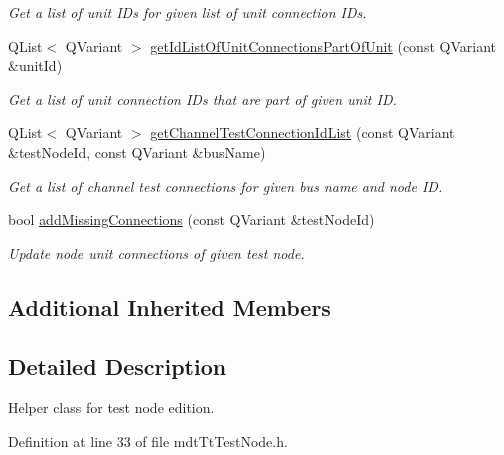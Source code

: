 \begin{DoxyCompactItemize}
\begin{DoxyCompactList}\small\item\em Get a list of unit I\-Ds for given list of unit connection I\-Ds. \end{DoxyCompactList}\item 
Q\-List$<$ Q\-Variant $>$ \hyperlink{classmdt_tt_test_node_aedbfa25bedac04b859b1cb3ef6a16510}{get\-Id\-List\-Of\-Unit\-Connections\-Part\-Of\-Unit} (const Q\-Variant \&unit\-Id)
\begin{DoxyCompactList}\small\item\em Get a list of unit connection I\-Ds that are part of given unit I\-D. \end{DoxyCompactList}\item 
Q\-List$<$ Q\-Variant $>$ \hyperlink{classmdt_tt_test_node_a07b8cd098d61c3f14d3ba226c1d1f1cb}{get\-Channel\-Test\-Connection\-Id\-List} (const Q\-Variant \&test\-Node\-Id, const Q\-Variant \&bus\-Name)
\begin{DoxyCompactList}\small\item\em Get a list of channel test connections for given bus name and node I\-D. \end{DoxyCompactList}\item 
bool \hyperlink{classmdt_tt_test_node_a65478d5d026969e8b17464707fc3551d}{add\-Missing\-Connections} (const Q\-Variant \&test\-Node\-Id)
\begin{DoxyCompactList}\small\item\em Update node unit connections of given test node. \end{DoxyCompactList}\end{DoxyCompactItemize}
\subsection*{Additional Inherited Members}


\subsection{Detailed Description}
Helper class for test node edition. 

Definition at line 33 of file mdt\-Tt\-Test\-Node.\-h.



